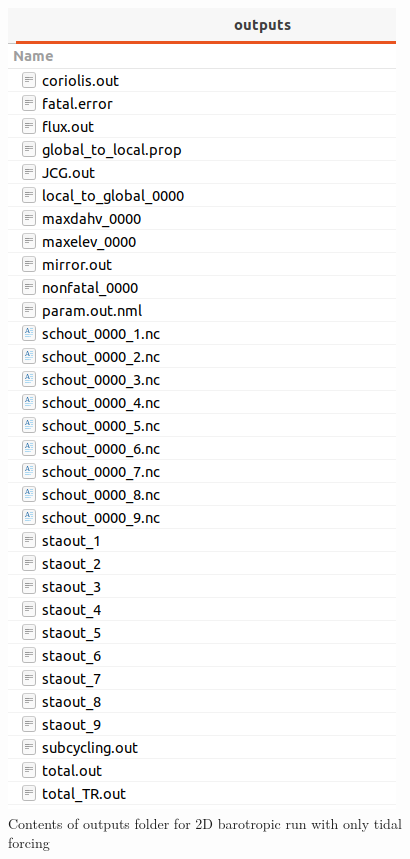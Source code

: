 \documentclass[preprints,briefreport,accept,oneauthor,pdftex]{Definitions/mdpi}
\begin{document}
\begin{figure}
\begin{minipage}[b]{0.45\textwidth}
    \includegraphics[width=\textwidth]{figures/outputs.png}
     \caption{Contents of outputs folder for 2D barotropic run with only tidal forcing}
     \label{fig:outputs}
    \end{minipage}
\end{figure}
\end{document}
